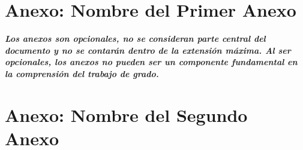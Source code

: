 \begin{appendix}
\chapter{Anexo: Nombre del Primer Anexo}\label{AnexoA}

\textit{\textbf{Los anexos son opcionales, no se consideran parte central del documento y no se contarán dentro de la extensión máxima. Al ser opcionales, los anexos no pueden ser un componente fundamental en la comprensión del trabajo de grado.}}\\[1.0cm]

\lipsum[9-10]

\chapter{Anexo: Nombre del Segundo Anexo}\label{AnexoB}

\lipsum[6-7]


\end{appendix}